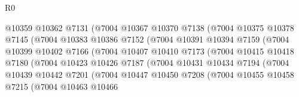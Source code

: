 \begin{lexlean}{R0}
\begin{coremodule}
                              @10359
                              @10362
                              @7131
                              (@7004
                                @10367
                                @10370
                                @7138
                                (@7004
                                  @10375
                                  @10378
                                  @7145
                                  (@7004
                                    @10383
                                    @10386
                                    @7152
                                    (@7004
                                      @10391
                                      @10394
                                      @7159
                                      (@7004
                                        @10399
                                        @10402
                                        @7166
                                        (@7004
                                          @10407
                                          @10410
                                          @7173
                                          (@7004
                                            @10415
                                            @10418
                                            @7180
                                            (@7004
                                              @10423
                                              @10426
                                              @7187
                                              (@7004
                                                @10431
                                                @10434
                                                @7194
                                                (@7004
                                                  @10439
                                                  @10442
                                                  @7201
                                                  (@7004
                                                    @10447
                                                    @10450
                                                    @7208
                                                    (@7004
                                                      @10455
                                                      @10458
                                                      @7215
                                                      (@7004
                                                        @10463
                                                        @10466

\end{coremodule}
\end{lexlean}
